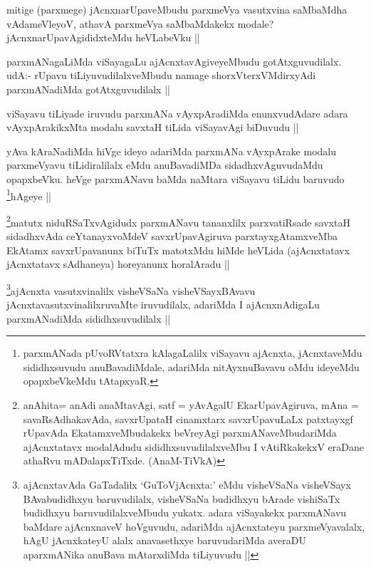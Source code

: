 \begin{artha}
mitige (parxmege) jAcnxnarUpaveMbudu parxmeVya vasutxvina saMbaMdha vAdameVleyoV, athavA parxmeVya saMbaMdakekx modale? jAcnxnarUpavAgididxteMdu heVLabeVku ||
\end{artha}

\begin{artha}
parxmANagaLiMda viSayagaLu ajAcnxtavAgiveyeMbudu gotAtxguvudilalx. udA:- rUpavu tiLiyuvudilalxveMbudu namage shorxVterxVMdirxyAdi parxmANadiMda gotAtxguvudilalx ||
\end{artha}

\begin{artha}
viSayavu tiLiyade iruvudu parxmANa vAyxpAradiMda enunxvudAdare adara vAyxpArakikxMta modalu savxtaH tiLida viSayavAgi biDuvudu ||
\end{artha}

\begin{artha}
yAva kAraNadiMda hiVge ideyo adariMda parxmANa vAyxpArake modalu parxmeVyavu tiLidiralilalx eMdu anuBavadiMDa sidadhxvAguvudaMdu opapxbeVku. heVge parxmANavu baMda naMtara viSayavu tiLidu baruvudo \footnote{parxmANada pUvoRVtatxra kAlagaLalilx viSayavu ajAcnxta, jAcnxtaveMdu sididhxsuvudu anuBavadiMdale, adariMda nitAyxnuBavavu oMdu ideyeMdu opapxbeVkeMdu tAtapxyaR.}hAgeye ||
\end{artha}

\begin{artha}
\footnote{anAhita= anAdi anaMtavAgi, satf = yAvAgalU EkarUpavAgiruva, mAna = savaRsAdhakavAda, savxrUpataH cinamxtarx savxrUpavuLaLx patxtayxgf rUpavAda EkatamxveMbudakekx beVreyAgi parxmANaveMbudariMda ajAcnxtatavx modalAdudu sididhxsuvudilalxveMbu I vAtiRkakekxV eraDane athaRvu mADalapxTiTxde. (AnaM-TiVkA)}matutx niduRSaTxvAgidudx parxmANavu tananxlilx parxvatiRsade savxtaH sidadhxvAda ceYtanayxvoMdeV savxrUpavAgiruva parxtayxgAtamxveMba EkAtamx savxrUpavanunx biTuTx matotxMdu hiMde heVLida (ajAcnxtatavx jAcnxtatavx sAdhaneya) horeyanunx horalAradu ||
\end{artha}

\begin{artha}
\footnote{ajAcnxtavAda GaTadalilx `GuToVjAcnxta:' eMdu visheVSaNa visheVSayx BAvabudidhxyu baruvudilalx, visheVSaNa budidhxyu bArade vishiSaTx budidhxyu baruvudilalxveMbudu yukatx. adara viSayakekx parxmANavu baMdare ajAcnxnaveV hoVguvudu, adariMda ajAcnxtateyu parxmeVyavalalx, hAgU jAcnxkateyU alalx anavasethxye baruvudariMda averaDU aparxmANika anuBava mAtarxdiMda tiLiyuvudu ||}ajAcnxta vasutxvinalilx visheVSaNa visheVSayxBAvavu jAcnxtavasutxvinalilxruvaMte iruvudilalx, adariMda I ajAcnxnAdigaLu parxmANadiMda sididhxsuvudilalx ||
\end{artha}

